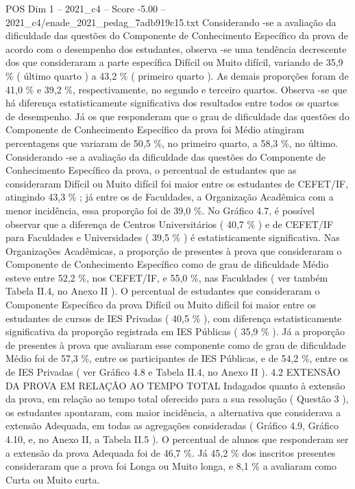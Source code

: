 \begin{textsample}{POS Dim 1 – 2021\_c4 – Score -5.00 – 2021\_c4/enade\_2021\_pedag\_7adb919c15.txt}
Considerando -se a avaliação da dificuldade das questões do Componente de Conhecimento Específico da prova de acordo com o desempenho dos estudantes, observa -se uma tendência decrescente dos que consideraram a parte específica Difícil ou Muito difícil, variando de 35,9 \% ( último quarto ) a 43,2 \% ( primeiro quarto ).
As demais proporções foram de 41,0 \% e 39,2 \%, respectivamente, no segundo e terceiro quartos.
Observa -se que há diferença estatisticamente significativa dos resultados entre todos os quartos de desempenho.
Já os que responderam que o grau de dificuldade das questões do Componente de Conhecimento Específico da prova foi Médio atingiram percentagens que variaram de 50,5 \%, no primeiro quarto, a 58,3 \%, no último.
Considerando -se a avaliação da dificuldade das questões do Componente de Conhecimento Específico da prova, o percentual de estudantes que as consideraram Difícil ou Muito difícil foi maior entre os estudantes de CEFET/IF, atingindo 43,3 \% ; já entre os de Faculdades, a Organização Acadêmica com a menor incidência, essa proporção foi de 39,0 \%.
No Gráfico 4.7, é possível observar que a diferença de Centros Universitários ( 40,7 \% ) e de CEFET/IF para Faculdades e Universidades ( 39,5 \% ) é estatisticamente significativa.
Nas Organizações Acadêmicas, a proporção de presentes à prova que consideraram o Componente de Conhecimento Específico como de grau de dificuldade Médio esteve entre 52,2 \%, nos CEFET/IF, e 55,0 \%, nas Faculdades ( ver também Tabela II.4, no Anexo II ).
O percentual de estudantes que consideraram o Componente Específico da prova Difícil ou Muito difícil foi maior entre os estudantes de cursos de IES Privadas ( 40,5 \% ), com diferença estatisticamente significativa da proporção registrada em IES Públicas ( 35,9 \% ).
Já a proporção de presentes à prova que avaliaram esse componente como de grau de dificuldade Médio foi de 57,3 \%, entre os participantes de IES Públicas, e de 54,2 \%, entre os de IES Privadas ( ver Gráfico 4.8 e Tabela II.4, no Anexo II ). 4.2 EXTENSÃO DA PROVA EM RELAÇÃO AO TEMPO TOTAL Indagados quanto à extensão da prova, em relação ao tempo total oferecido para a sua resolução ( Questão 3 ), os estudantes apontaram, com maior incidência, a alternativa que considerava a extensão Adequada, em todas as agregações consideradas ( Gráfico 4.9, Gráfico 4.10, e, no Anexo II, a Tabela II.5 ).
O percentual de alunos que responderam ser a extensão da prova Adequada foi de 46,7 \%.
Já 45,2 \% dos inscritos presentes consideraram que a prova foi Longa ou Muito longa, e 8,1 \% a avaliaram como Curta ou Muito curta.

\end{textsample}
